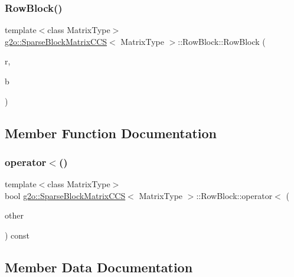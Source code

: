 \subsubsection{\texorpdfstring{Row\+Block()}{RowBlock()}\hspace{0.1cm}{\footnotesize\ttfamily [2/2]}}
{\footnotesize\ttfamily template$<$class Matrix\+Type$>$ \\
\mbox{\hyperlink{classg2o_1_1_sparse_block_matrix_c_c_s}{g2o\+::\+Sparse\+Block\+Matrix\+C\+CS}}$<$ Matrix\+Type $>$\+::Row\+Block\+::\+Row\+Block (\begin{DoxyParamCaption}\item[{int}]{r,  }\item[{Matrix\+Type $\ast$}]{b }\end{DoxyParamCaption})\hspace{0.3cm}{\ttfamily [inline]}}



\subsection{Member Function Documentation}
\mbox{\label{structg2o_1_1_sparse_block_matrix_c_c_s_1_1_row_block_aba437a681bd37d7320fc74e860ce2acf}} 
\subsubsection{\texorpdfstring{operator$<$()}{operator<()}}
{\footnotesize\ttfamily template$<$class Matrix\+Type$>$ \\
bool \mbox{\hyperlink{classg2o_1_1_sparse_block_matrix_c_c_s}{g2o\+::\+Sparse\+Block\+Matrix\+C\+CS}}$<$ Matrix\+Type $>$\+::Row\+Block\+::operator$<$ (\begin{DoxyParamCaption}\item[{const \mbox{\hyperlink{structg2o_1_1_sparse_block_matrix_c_c_s_1_1_row_block}{Row\+Block}} \&}]{other }\end{DoxyParamCaption}) const\hspace{0.3cm}{\ttfamily [inline]}}



\subsection{Member Data Documentation}
\mbox{\label{structg2o_1_1_sparse_block_matrix_c_c_s_1_1_row_block_a88ab75d0e29496d3ca023105256a2926}} 
